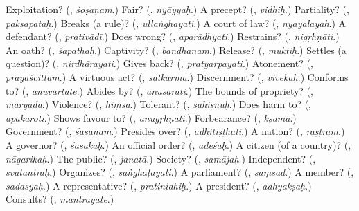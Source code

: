 \begin{tcolorbox}[breakable,colback=teal!4,colframe=teal!35!black,title={Before you move on}]
Exploitation? (\textbf{}, \emph{śoṣaṇam}.) Fair? (\textbf{}, \emph{nyāyyaḥ}.) A precept? (\textbf{}, \emph{vidhiḥ}.) Partiality? (\textbf{}, \emph{pakṣapātaḥ}.) Breaks (a rule)? (\textbf{}, \emph{ullaṅghayati}.) A court of law? (\textbf{}, \emph{nyāyālayaḥ}.) A defendant? (\textbf{}, \emph{prativādī}.) Does wrong? (\textbf{}, \emph{aparādhyati}.) Restrains? (\textbf{}, \emph{nigṛhṇāti}.) An oath? (\textbf{}, \emph{śapathaḥ}.) Captivity? (\textbf{}, \emph{bandhanam}.) Release? (\textbf{}, \emph{muktiḥ}.) Settles (a question)? (\textbf{}, \emph{nirdhārayati}.) Gives back? (\textbf{}, \emph{pratyarpayati}.) Atonement? (\textbf{}, \emph{prāyaścittam}.) A virtuous act? (\textbf{}, \emph{satkarma}.) Discernment? (\textbf{}, \emph{vivekaḥ}.) Conforms to? (\textbf{}, \emph{anuvartate}.) Abides by? (\textbf{}, \emph{anusarati}.) The bounds of propriety? (\textbf{}, \emph{maryādā}.) Violence? (\textbf{}, \emph{hiṃsā}.) Tolerant? (\textbf{}, \emph{sahiṣṇuḥ}.) Does harm to? (\textbf{}, \emph{apakaroti}.) Shows favour to? (\textbf{}, \emph{anugṛhṇāti}.) Forbearance? (\textbf{}, \emph{kṣamā}.) Government? (\textbf{}, \emph{śāsanam}.) Presides over? (\textbf{}, \emph{adhitiṣṭhati}.) A nation? (\textbf{}, \emph{rāṣṭram}.) A governor? (\textbf{}, \emph{śāsakaḥ}.) An official order? (\textbf{}, \emph{ādeśaḥ}.) A citizen (of a country)? (\textbf{}, \emph{nāgarikaḥ}.) The public? (\textbf{}, \emph{janatā}.) Society? (\textbf{}, \emph{samājaḥ}.) Independent? (\textbf{}, \emph{svatantraḥ}.) Organizes? (\textbf{}, \emph{saṅghaṭayati}.) A parliament? (\textbf{}, \emph{saṃsad}.) A member? (\textbf{}, \emph{sadasyaḥ}.) A representative? (\textbf{}, \emph{pratinidhiḥ}.) A president? (\textbf{}, \emph{adhyakṣaḥ}.) Consults? (\textbf{}, \emph{mantrayate}.)
\end{tcolorbox}
